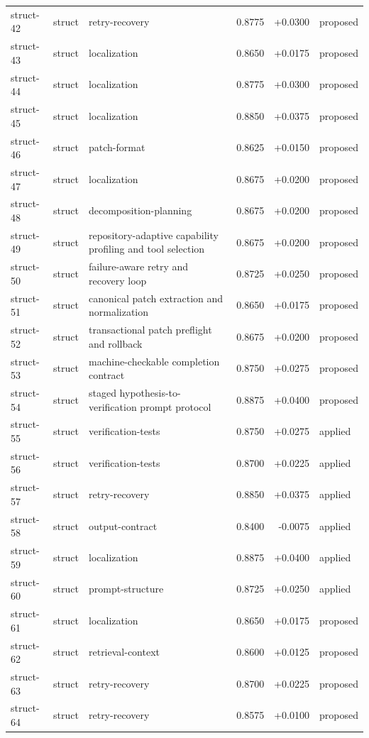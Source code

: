 \begin{center}
\begin{longtable}{llp{5.2cm}rrl}
struct-42 & struct & retry-recovery & 0.8775 & +0.0300 & proposed \\
struct-43 & struct & localization & 0.8650 & +0.0175 & proposed \\
struct-44 & struct & localization & 0.8775 & +0.0300 & proposed \\
struct-45 & struct & localization & 0.8850 & +0.0375 & proposed \\
struct-46 & struct & patch-format & 0.8625 & +0.0150 & proposed \\
struct-47 & struct & localization & 0.8675 & +0.0200 & proposed \\
struct-48 & struct & decomposition-planning & 0.8675 & +0.0200 & proposed \\
struct-49 & struct & repository-adaptive capability profiling and tool selection & 0.8675 & +0.0200 & proposed \\
struct-50 & struct & failure-aware retry and recovery loop & 0.8725 & +0.0250 & proposed \\
struct-51 & struct & canonical patch extraction and normalization & 0.8650 & +0.0175 & proposed \\
struct-52 & struct & transactional patch preflight and rollback & 0.8675 & +0.0200 & proposed \\
struct-53 & struct & machine-checkable completion contract & 0.8750 & +0.0275 & proposed \\
struct-54 & struct & staged hypothesis-to-verification prompt protocol & 0.8875 & +0.0400 & proposed \\
struct-55 & struct & verification-tests & 0.8750 & +0.0275 & applied \\
struct-56 & struct & verification-tests & 0.8700 & +0.0225 & applied \\
struct-57 & struct & retry-recovery & 0.8850 & +0.0375 & applied \\
struct-58 & struct & output-contract & 0.8400 & -0.0075 & applied \\
struct-59 & struct & localization & 0.8875 & +0.0400 & applied \\
struct-60 & struct & prompt-structure & 0.8725 & +0.0250 & applied \\
struct-61 & struct & localization & 0.8650 & +0.0175 & proposed \\
struct-62 & struct & retrieval-context & 0.8600 & +0.0125 & proposed \\
struct-63 & struct & retry-recovery & 0.8700 & +0.0225 & proposed \\
struct-64 & struct & retry-recovery & 0.8575 & +0.0100 & proposed \\

\end{longtable}
\end{center}
